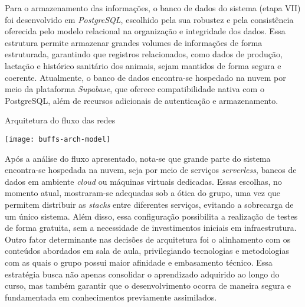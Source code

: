 Para o armazenamento das informações, o banco de dados do sistema (etapa VII) foi desenvolvido em \textit{PostgreSQL}, escolhido pela sua robustez e pela consistência oferecida pelo modelo relacional na organização e integridade dos dados. Essa estrutura permite armazenar grandes volumes de informações de forma estruturada, garantindo que registros relacionados, como dados de produção, lactação e histórico sanitário dos animais, sejam mantidos de forma segura e coerente. Atualmente, o banco de dados encontra-se hospedado na nuvem por meio da plataforma \textit{Supabase}, que oferece compatibilidade nativa com o PostgreSQL, além de recursos adicionais de autenticação e armazenamento.

\begin{flowchart}[!htb]
\centering
\caption{Arquitetura do fluxo das redes}%
\label{fcht:arquitetura}
\texttt{[image: buffs-arch-model]}
\end{flowchart}

Após a análise do fluxo apresentado, nota-se que grande parte do sistema encontra-se hospedada na nuvem, seja por meio de serviços \textit{serverless}, bancos de dados em ambiente \textit{cloud} ou máquinas virtuais dedicadas. Essas escolhas, no momento atual, mostraram-se adequadas sob a ótica do grupo, uma vez que permitem distribuir as \textit{stacks} entre diferentes serviços, evitando a sobrecarga de um único sistema. Além disso, essa configuração possibilita a realização de testes de forma gratuita, sem a necessidade de investimentos iniciais em infraestrutura. Outro fator determinante nas decisões de arquitetura foi o alinhamento com os conteúdos abordados em sala de aula, privilegiando tecnologias e metodologias com as quais o grupo possui maior afinidade e embasamento técnico. Essa estratégia busca não apenas consolidar o aprendizado adquirido ao longo do curso, mas também garantir que o desenvolvimento ocorra de maneira segura e fundamentada em conhecimentos previamente assimilados.
